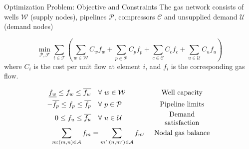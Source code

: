 \documentclass[hyperref={colorlinks,citecolor=blue,linkcolor=blue,urlcolor=blue}]{beamer}
\begin{document}
\begin{frame}{Optimization Problem: Objective and Constraints}
\footnotesize
The gas network consists of wells $\mathcal{W}$ (supply nodes), pipelines $\mathcal{P}$, compressors $\mathcal{C}$ and unsupplied demand $\mathcal{U}$ (demand nodes) 

\[
\min_{\mathcal{P}, \mathcal{F}} 
\sum_{t \in \mathcal{T}} \left(
\sum_{w \in \mathcal{W}} C_{w} f_{w} +
\sum_{p \in \mathcal{P}} C_{p} f_{p} +
\sum_{c \in \mathcal{C}} C_{c} f_{c} +
\sum_{u \in \mathcal{U}} C_{u} f_{u}
\right)
\]
where $C_i$ is the cost per unit flow at element $i$, and $f_i$ is the corresponding gas flow.

\begin{align}
    \underline{f_{w}} \leq f_{w} \leq \overline{f_{w}} 
    &\quad \forall \ w \in \mathcal{W} 
    &&\parbox{3cm}{\centering Well capacity} \label{eq:well_limits} \\
    -\overline{f_{p}} \leq f_{p} \leq \overline{f_{p}} 
    &\quad \forall \ p \in \mathcal{P} 
    &&\parbox{3cm}{\centering Pipeline limits} \label{eq:pipe_limits} \\
    0 \leq f_{u} \leq \overline{f_{u}} 
    &\quad \forall \ u \in \mathcal{U} 
    &&\parbox{3cm}{\centering Demand satisfaction} \label{eq:dem_limit_gas} \\
    \sum_{m:(m,n)\in\mathcal{A}} f_{m} 
    &= \sum_{m':(n,m')\in\mathcal{A}} f_{m'} 
    &&\parbox{3cm}{\centering Nodal gas balance} \label{eq:gas_balance}
\end{align}
\end{frame}




%
%
\end{document}
